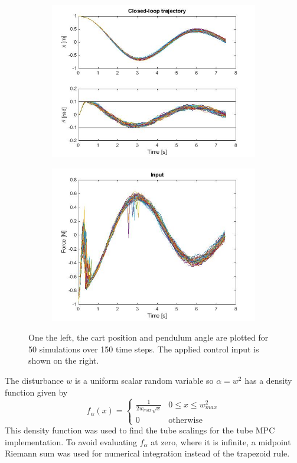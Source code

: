 \documentclass[12 pt]{report}
\begin{document}
\begin{figure}
	\centering
	\begin{subfigure}{.45\textwidth}
		\centering
		\includegraphics[width = 0.8\linewidth]{SCMPC_cartPenX.jpg}
		\label{fig:SCMPC_cartPenX}
	\end{subfigure}
	\begin{subfigure}{.45\textwidth}
		\centering
		\includegraphics[width = 0.8\linewidth]{SCMPC_cartPenU.jpg}
		\label{fig:SCMPC_cartPenU}
	\end{subfigure}
	\caption{One the left, the cart position and pendulum angle are plotted for 50 simulations over 150 time steps. The applied control input is shown on the right.}
\end{figure}

The disturbance $w$ is a uniform scalar random variable so $\alpha = w^2$ has a density function given by $$ f_\alpha (x) = \begin{cases}
\frac{1}{2w_{max}\sqrt{x}} & 0 \leq x \leq w_{max}^2 \\
0 &	\mathrm{otherwise}
\end{cases} $$
This density function was used to find the tube scalings for the tube MPC implementation. To avoid evaluating $f_\alpha$ at zero, where it is infinite, a midpoint Riemann sum was used for numerical integration instead of the trapezoid rule.
\end{document}
